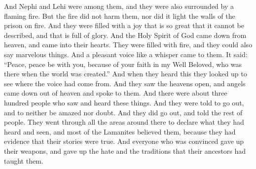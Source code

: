 And Nephi and Lehi were among them, and they were also surrounded by a flaming fire. But the fire did not harm them, nor did it light the walls of the prison on fire. And they were filled with a joy that is so great that it cannot be described, and that is full of glory.
\bverse \iffalse And behold, the Holy Spirit of God did come down from heaven, and did enter into their hearts, and they were filled as if with fire, and they could speak forth marvelous words. \fi
And the Holy Spirit of God came down from heaven, and came into their hearts. They were filled with fire, and they could also say marvelous things.
\bverse \iffalse And it came to pass that there came a voice unto them, yea, a pleasant voice, as if it were a whisper, saying: \fi
And a pleasant voice like a whisper came to them. It said:
\bverse \iffalse Peace, peace be unto you, because of your faith in my Well Beloved, who was from the foundation of the world. \fi
``Peace, peace be with you, because of your faith in my Well Beloved, who was there when the world was created.''
\bverse \iffalse And now, when they heard this they cast up their eyes as if to behold from whence the voice came; and behold, they saw the heavens open; and angels came down out of heaven and ministered unto them. \fi
And when they heard this they looked up to see where the voice had come from. And they saw the heavens open, and angels came down out of heaven and spoke to them.
\bverse \iffalse And there were about three hundred souls who saw and heard these things; and they were bidden to go forth and marvel not, neither should they doubt. \fi
And there were about three hundred people who saw and heard these things. And they were told to go out, and to neither be amazed nor doubt.
\bverse \iffalse And it came to pass that they did go forth, and did minister unto the people, declaring throughout all the regions round about all the things which they had heard and seen, insomuch that the more part of the Lamanites were convinced of them, because of the greatness of the evidences which they had received. \fi
And they did go out, and told the rest of people. They went through all the areas around there to declare what they had heard and seen, and most of the Lamanites believed them, because they had evidence that their stories were true.
\bverse \iffalse And as many as were convinced did lay down their weapons of war, and also their hatred and the tradition of their fathers. \fi
And everyone who was convinced gave up their weapons, and gave up the hate and the traditions that their ancestors had taught them.
